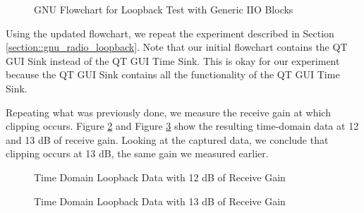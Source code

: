 \documentclass{article}
\begin{document}
\begin{figure}[H]
	\centerline{}
	\caption{GNU Flowchart for Loopback Test with Generic IIO Blocks}
	\label{fig::gnu_radio_loopback_generic_iio}
\end{figure}

Using the updated flowchart, we repeat the experiment described in Section \ref{section::gnu_radio_loopback}. Note that our initial flowchart contains the QT GUI Sink instead of the QT GUI Time Sink. This is okay for our experiment because the QT GUI Sink contains all the functionality of the QT GUI Time Sink.

Repeating what was previously done, we measure the receive gain at which clipping occurs. Figure \ref{fig::gnu_radio_loopback_generic_iio_rx_gain_12dB} and Figure 
\ref{fig::gnu_radio_loopback_generic_iio_rx_gain_13dB} show the resulting time-domain data at 12 and 13 dB of receive gain. Looking at the captured data, we conclude that clipping occurs at 13 dB, the same gain we measured earlier.
 
\begin{figure}[H]
	\centerline{}
	\caption{Time Domain Loopback Data with 12 dB of Receive Gain}
	\label{fig::gnu_radio_loopback_generic_iio_rx_gain_12dB}
\end{figure}

\begin{figure}[H]
	\centerline{}
	\caption{Time Domain Loopback Data with 13 dB of Receive Gain}
	\label{fig::gnu_radio_loopback_generic_iio_rx_gain_13dB}
\end{figure}
\end{document}
